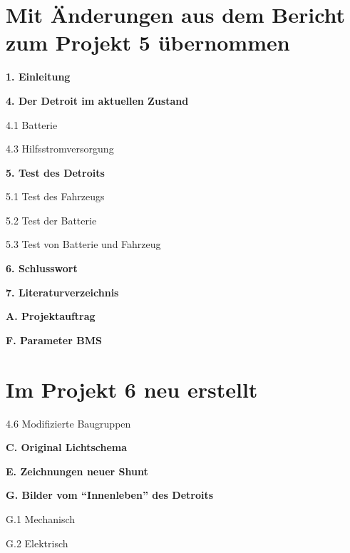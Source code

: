 \section*{Mit Änderungen aus dem Bericht zum Projekt 5 übernommen}
\begin{compactitem}
\item \textbf{1. Einleitung}
\item \textbf{4. Der Detroit im aktuellen Zustand}
\item 4.1 Batterie
\item 4.3 Hilfsstromversorgung
\item \textbf{5. Test des Detroits}
\item 5.1 Test des Fahrzeugs
\item 5.2 Test der Batterie
\item 5.3 Test von Batterie und Fahrzeug
\item \textbf{6. Schlusswort}
\item \textbf{7. Literaturverzeichnis}
\item \textbf{A. Projektauftrag}
\item \textbf{F. Parameter BMS}
\end{compactitem}

\section*{Im Projekt 6 neu erstellt}
\begin{compactitem}
\item 4.6 Modifizierte Baugruppen
\item \textbf{C. Original Lichtschema}
\item \textbf{E. Zeichnungen neuer Shunt}
\item \textbf{G. Bilder vom "`Innenleben"' des Detroits}
\item G.1 Mechanisch
\item G.2 Elektrisch
\end{compactitem}